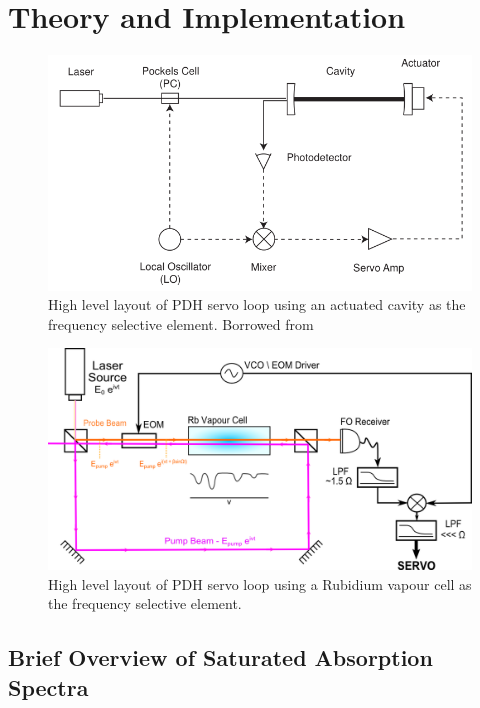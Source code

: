 \newpage
\section{Theory and Implementation} \label{sec:theory}

\begin{figure}[!hrt]
  \centering
  \label{cavity_eom_pdh}
  \includegraphics[scale=0.5]{cavity_eom_pdh.png}
  \caption{High level layout of PDH servo loop using an actuated cavity as
  the frequency selective element. Borrowed from \cite{black1998}}
\end{figure}

\begin{figure}[!hrt]
  \centering
  \label{vapour_eom_pdh}
  \includegraphics[scale=0.9]{EOM_PDH_UNIT.png}
  \caption{High level layout of PDH servo loop using a Rubidium vapour cell as
  the frequency selective element.}
\end{figure}

\subsection{Brief Overview of Saturated Absorption Spectra}

